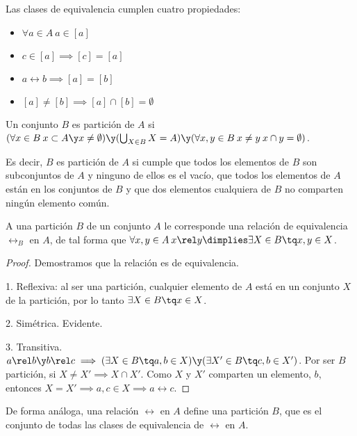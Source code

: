 \documentclass[nochap]{apuntes}
\begin{document}
Las clases de equivalencia cumplen cuatro propiedades:

\begin{itemize}
\item $\forall a \in A \: a \in [a]$
\item $ c \in [a] \implies [c]=[a] $
\item $ a\rel b \implies [a]=[b] $
\item $ [a]\neq [b] \implies [a] \cap [b] = \emptyset $
\end{itemize}

\begin{defn}[Particiones]
Un conjunto $B$ es partición de $A$ si $(\forall x \in B \: x \subset A \y x \neq \emptyset) \y (\bigcup_{X\in B} X = A) \y (\forall x,y \in B \: x\neq y \: x \cap y = \emptyset)$.

Es decir, $B$ es partición de $A$ si cumple que todos los elementos de $B$ son subconjuntos de $A$ y ninguno de ellos es el vacío, que todos los elementos de $A$ están en los conjuntos de $B$ y que dos elementos cualquiera de $B$ no comparten ningún elemento común.
\end{defn}

\begin{prop}
A una partición $B$ de un conjunto $A$ le corresponde una relación de equivalencia $\rel_B$ en $A$, de tal forma que $\forall x,y \in A \: x\rel y \dimplies \exists X \in B \tq x,y \in X$.
\end{prop}

\begin{proof}
Demostramos que la relación es de equivalencia.

1. Reflexiva: al ser una partición, cualquier elemento de $A$ está en un conjunto $X$ de la partición, por lo tanto $\exists X \in B \tq x \in X$.

2. Simétrica. Evidente.

3. Transitiva. $a\rel b \y b\rel c \implies (\exists X \in B \tq a,b \in X) \y (\exists X' \in B \tq c,b \in X')$. Por ser $B$ partición, si $X\neq X' \implies X \cap X'$. Como $X$ y $X'$ comparten un elemento, $b$, entonces $X=X' \implies a,c \in X \implies a\rel c$.
\end{proof}

\begin{prop}
De forma análoga, una relación $\rel$ en $A$ define una partición $B$, que es el conjunto de todas las clases de equivalencia de $\rel$ en $A$.
\end{prop}
\end{document}
